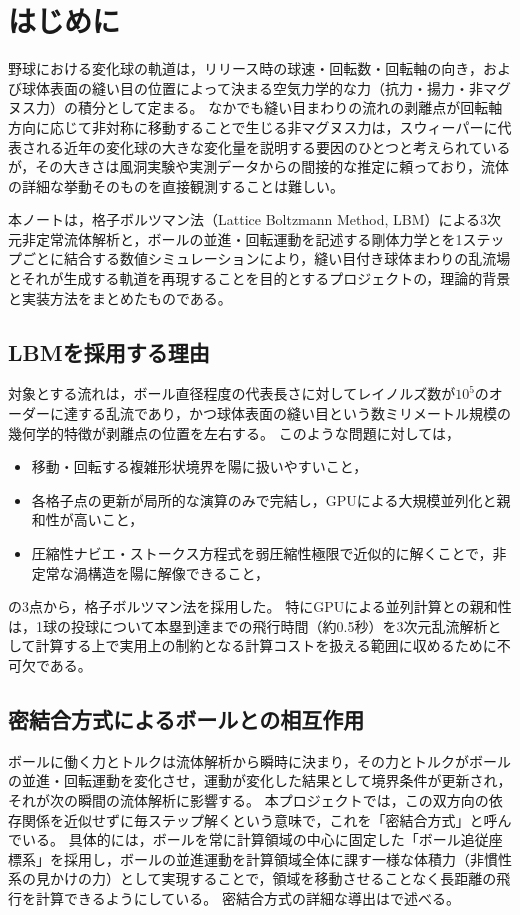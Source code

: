 \section{はじめに}
\label{sec:intro}

野球における変化球の軌道は，リリース時の球速・回転数・回転軸の向き，および球体表面の縫い目の位置によって決まる空気力学的な力（抗力・揚力・非マグヌス力）の積分として定まる。
なかでも縫い目まわりの流れの剥離点が回転軸方向に応じて非対称に移動することで生じる非マグヌス力は，スウィーパーに代表される近年の変化球の大きな変化量を説明する要因のひとつと考えられているが，その大きさは風洞実験や実測データからの間接的な推定に頼っており，流体の詳細な挙動そのものを直接観測することは難しい。

本ノートは，格子ボルツマン法（Lattice Boltzmann Method, LBM）による3次元非定常流体解析と，ボールの並進・回転運動を記述する剛体力学とを1ステップごとに結合する数値シミュレーションにより，縫い目付き球体まわりの乱流場とそれが生成する軌道を再現することを目的とするプロジェクトの，理論的背景と実装方法をまとめたものである。

\subsection{LBMを採用する理由}

対象とする流れは，ボール直径程度の代表長さに対してレイノルズ数が\(10^5\)のオーダーに達する乱流であり，かつ球体表面の縫い目という数ミリメートル規模の幾何学的特徴が剥離点の位置を左右する。
このような問題に対しては，
\begin{itemize}
	\item 移動・回転する複雑形状境界を陽に扱いやすいこと，
	\item 各格子点の更新が局所的な演算のみで完結し，GPUによる大規模並列化と親和性が高いこと，
	\item 圧縮性ナビエ・ストークス方程式を弱圧縮性極限で近似的に解くことで，非定常な渦構造を陽に解像できること，
\end{itemize}
の3点から，格子ボルツマン法を採用した。
特にGPUによる並列計算との親和性は，1球の投球について本塁到達までの飛行時間（約0.5秒）を3次元乱流解析として計算する上で実用上の制約となる計算コストを扱える範囲に収めるために不可欠である。

\subsection{密結合方式によるボールとの相互作用}

ボールに働く力とトルクは流体解析から瞬時に決まり，その力とトルクがボールの並進・回転運動を変化させ，運動が変化した結果として境界条件が更新され，それが次の瞬間の流体解析に影響する。
本プロジェクトでは，この双方向の依存関係を近似せずに毎ステップ解くという意味で，これを「密結合方式」と呼んでいる。
具体的には，ボールを常に計算領域の中心に固定した「ボール追従座標系」を採用し，ボールの並進運動を計算領域全体に課す一様な体積力（非慣性系の見かけの力）として実現することで，領域を移動させることなく長距離の飛行を計算できるようにしている。
密結合方式の詳細な導出はで述べる。

